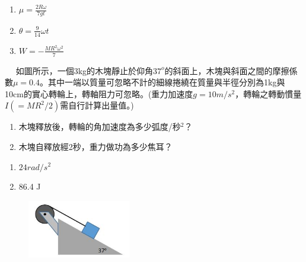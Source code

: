 \documentclass[cn,10pt,math=newtx,chinesefont=founder]{elegantbook}
\begin{document}
\begin{solution}
\begin{enumerate}[label=(\arabic*)]
\item $\mu=\frac{2R\omega}{7gt}$
\item $\theta=\frac{9}{14}\omega t$
\item $W=-\frac{MR^2\omega^2}{7}$
\end{enumerate}
\end{solution}

\newpage






\begin{example}　
    如圖所示，一個3kg的木塊靜止於仰角$37^o$的斜面上，木塊與斜面之間的摩擦係數$\mu=0.4$。其中一端以質量可忽略不計的細線捲繞在質量與半徑分別為1kg與10cm的實心轉輪上，轉軸阻力可忽略。(重力加速度$g=10m/s^2$，轉輪之轉動慣量$I(=MR^2/2)$需自行計算出量值。)
    \begin{enumerate}[label=(\arabic*)]
    \item 木塊釋放後，轉輪的角加速度為多少弧度/秒$^2$？
    \item 木塊自釋放經2秒，重力做功為多少焦耳？
    \end{enumerate}
    
    \rightline{[1]}
\end{example}

\begin{solution}
\begin{enumerate}[label=(\arabic*)]
\item $24 rad/s^2$
\item 86.4 J
\end{enumerate}
\end{solution}

\begin{figure}[htbp]
\flushright
\includegraphics[width=0.4\textwidth]{image/111.JPG}
\end{figure}

\newpage
\end{document}
